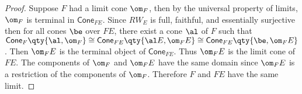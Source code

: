 \documentclass[main.tex]{subfiles}
\begin{document}
\begin{proof}
	Suppose $F$ had a limit cone $\om_{F}$, then by the universal property
	of limits, $\om_{F}$ is terminal in $\mathsf{Cone}_{FE}$. Since $RW_{E}$
	is full, faithful, and essentially surjective then for all cones $\be$
	over $FE$, there exist a cone $\al$ of $F$ such that
	$\mathsf{Cone}_{F}\qty{\al,\om_{F}} \cong \mathsf{Cone}_{FE}\qty{\al E,
	\om_{F} E}  \cong \mathsf{Cone}_{FE}\qty{\be,\om_{F}E}$. Then
	$\om_{F}E$ is the terminal object of $\mathsf{Cone}_{FE}$. Thus $\om_{F}E$
	is the limit cone of $FE$. The components of $\om_{F}$ and $\om_{F}E$ have
	the same domain since $\om_{F}E$ is a restriction of the components of
	$\om_{F}$. Therefore $F$ and $FE$ have the same limit.

\end{proof}
\end{document}
